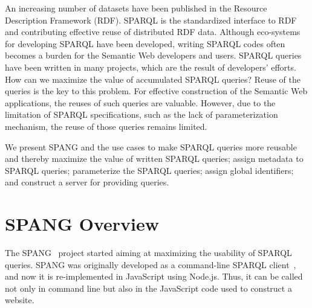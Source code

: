 \documentclass[runningheads]{llncs}
\begin{document}
An increasing number of datasets have been published in the Resource Description Framework (RDF).
SPARQL is the standardized interface to RDF and contributing effective reuse of distributed RDF data. 
Although eco-systems for developing SPARQL have been developed, writing SPARQL codes often becomes a burden for the Semantic Web developers and users. 
SPARQL queries have been written in many projects, which are the result of developers' efforts. 
How can we maximize the value of accumulated SPARQL queries?
Reuse of the queries is the key to this problem.
For effective construction of the Semantic Web applications, the reuses of such queries are valuable.
However, due to the limitation of SPARQL specifications, such as the lack of parameterization mechanism, the reuse of those queries remains limited. 


We present SPANG and the use cases to make SPARQL queries more reusable and thereby maximize the value of written SPARQL queries;
assign metadata to SPARQL queries;
parameterize the SPARQL queries;
assign global identifiers; and
construct a server for providing queries.


\section{SPANG Overview}

The SPANG~\cite{spang} project started aiming at maximizing the usability of SPARQL queries. 
SPANG was originally developed as a command-line SPARQL client~\cite{spang}, and now it is re-implemented in JavaScript using Node.js. Thus, it can be called not only in command line but also in the JavaScript code used to construct a website.
\end{document}
